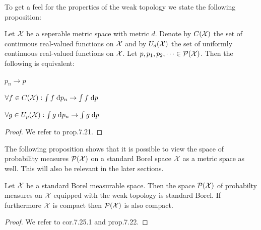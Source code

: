 To get a feel for the properties of the weak topology we state the following
proposition:

\begin{prop} \label{prop:weakTop}
  Let $\mathcal{X}$ be a seperable metric space with metric $d$.
  Denote by $C(\mathcal{X})$ the set of continuous real-valued functions on $\mathcal{X}$
  and by $U_d(\mathcal{X})$ the set of uniformly continuous real-valued functions
  on $\mathcal{X}$. Let $p, p_1, p_2, \dots \in \mathcal{P}(\mathcal{X})$. Then
  the following is equivalent:
  \begin{center}
    \begin{enumerate*}[label=(\alph*), itemjoin=\hspace{0.3in}]
    \item $p_n \to p$
    \item $\forall f \in C(\mathcal{X}) : \int f \; \mathrm{d} p_n \to \int f \; \mathrm{d} p$
    \item $\forall g \in U_p(\mathcal{X}) : \int g \; \mathrm{d} p_n \to \int g \; \mathrm{d} p$
  \end{enumerate*}
\end{center}
\end{prop}
\begin{proof}
  We refer to  prop.7.21.
\end{proof}

The following proposition shows that it is possible to view the
space of probability measures $\mathcal{P}(\mathcal{X})$ on a standard Borel space
$\mathcal{X}$ as a metric space as well. This will also be relevant 
in the later sections.

\begin{prop}
  Let $\mathcal{X}$ be a standard Borel measurable space.
  Then the space $\mathcal{P}(\mathcal{X})$ of probabilty measures on $\mathcal{X}$
  equipped with the weak topology is standard Borel.
  If furthermore $\mathcal{X}$ is compact then $\mathcal{P}(\mathcal{X})$ is also compact.
  \label{prop:pxstandardborel}
\end{prop}
\begin{proof}
  We refer to  cor.7.25.1 and prop.7.22.
\end{proof}

